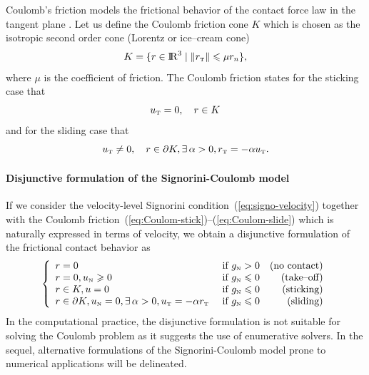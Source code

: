 Coulomb's friction  models the frictional behavior of the contact force law in the tangent plane . Let us define the Coulomb friction  cone $K$ which is chosen as the isotropic second order cone (Lorentz or ice--cream cone)
\begin{equation}
  \label{eq:CoulombCone}
  K = \{r \in \RR^3 \mid \|r_\t\| \leq \mu r_n\},
\end{equation}
where $\mu$ is the coefficient of friction. The Coulomb friction  states for the sticking case that 
\begin{equation}
  \label{eq:Coulom-stick}
  u_{\t} =0,\quad r \in K
\end{equation}
and for the sliding case that
\begin{equation}
  \label{eq:Coulom-slide}
  u_{\t}  \neq 0,\quad r \in \partial K, \exists\, \alpha > 0, r_\t = -\alpha u_\t.
\end{equation}

\paragraph{Disjunctive formulation of the Signorini-Coulomb model}

If we consider the velocity-level Signorini condition~(\ref{eq:signo-velocity}) together with the Coulomb friction~(\ref{eq:Coulom-stick})--(\ref{eq:Coulom-slide}) which is naturally expressed in terms of velocity, we obtain a disjunctive formulation of the frictional contact behavior as
\begin{equation}
  \label{eq:contact-disjunctive}
  \left\{\begin{array}{llr}
      r = 0  &\text{ if } g_{\n} > 0  & \text{(no contact)}\\
      r = 0,  u_\n \geq 0   &\text{ if } g_{\n} \leq 0 & \text{(take--off)} \\
      r \in K, u =0 &\text{ if } g_{\n} \leq 0 & \text{(sticking)}  \\
      r \in \partial K,u _\n=0,  \exists\,\alpha > 0, u_\t = -\alpha r_\t &\text{ if } g_{\n} \leq 0 & \text{(sliding)}  \\
\end{array}\right.
\end{equation}
In the computational practice, the disjunctive formulation is not suitable for  solving the Coulomb problem as it suggests the use of enumerative solvers. In the sequel, alternative formulations of the Signorini-Coulomb model prone to numerical applications will be delineated.

